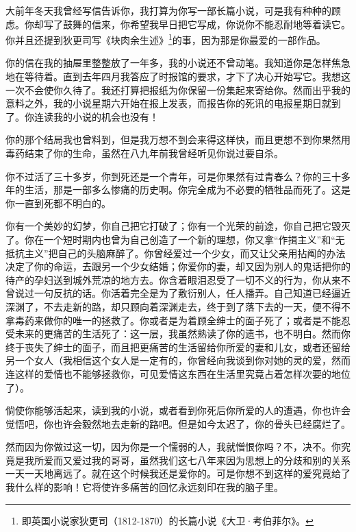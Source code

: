 \par 大前年冬天我曾经写信告诉你，我打算为你写一部长篇小说，可是我有种种的顾虑。你却写了鼓舞的信来，你希望我早日把它写成，你说你不能忍耐地等着读它。你并且还提到狄更司写《块肉余生述》\footnote{即英国小说家狄更司（1812-1870）的长篇小说《大卫·考伯菲尔》。}的事，因为那是你最爱的一部作品。
\par 你的信在我的抽屉里整整放了一年多，我的小说还不曾动笔。我知道你是怎样焦急地在等待着。直到去年四月我答应了时报馆的要求，才下了决心开始写它。我想这一次不会使你久待了。我还打算把报纸为你保留一份集起来寄给你。然而出乎我的意料之外，我的小说星期六开始在报上发表，而报告你的死讯的电报星期日就到了。你连读我的小说的机会也没有！
\par 你的那个结局我也曾料到，但是我万想不到会来得这样快，而且更想不到你果然用毒药结束了你的生命，虽然在八九年前我曾经听见你说过要自杀。
\par 你不过活了三十多岁，你到死还是一个青年，可是你果然有过青春么？你的三十多年的生活，那是一部多么惨痛的历史啊。你完全成为不必要的牺牲品而死了。这是你一直到死都不明白的。
\par 你有一个美妙的幻梦，你自己把它打破了；你有一个光荣的前途，你自己把它毁灭了。你在一个短时期内也曾为自己创造了一个新的理想，你又拿“作揖主义”和“无抵抗主义”把自己的头脑麻醉了。你曾经爱过一个少女，而又让父亲用拈阄的办法决定了你的命运，去跟另一个少女结婚；你爱你的妻，却又因为别人的鬼话把你的待产的孕妇送到城外荒凉的地方去。你含着眼泪忍受了一切不义的行为，你从来不曾说过一句反抗的话。你活着完全是为了敷衍别人，任人播弄。自己知道已经逼近深渊了，不去走新的路，却只顾向着深渊走去，终于到了落下去的一天，便不得不拿毒药来做你的唯一的拯救了。你或者是为着顾全绅士的面子死了；或者是不能忍受未来的更痛苦的生活死了：这一层，我虽然熟读了你的遗书，也不明白。然而你终于丧失了绅士的面子，而且把更痛苦的生活留给你所爱的妻和儿女，或者还留给另一个女人（我相信这个女人是一定有的，你曾经向我谈到你对她的灵的爱，然而连这样的爱情也不能够拯救你，可见爱情这东西在生活里究竟占着怎样次要的地位了）。
\par 倘使你能够活起来，读到我的小说，或者看到你死后你所爱的人的遭遇，你也许会觉悟吧，你也许会毅然地去走新的路吧。但是如今太迟了，你的骨头已经腐烂了。
\par 然而因为你做过这一切，因为你是一个懦弱的人，我就憎恨你吗？不，决不。你究竟是我所爱而又爱过我的哥哥，虽然我们这七八年来因为思想上的分歧和别的关系一天一天地离远了。就在这个时候我还是爱你的。可是你想不到这样的爱究竟给了我什么样的影响！它将使许多痛苦的回忆永远刻印在我的脑子里。
